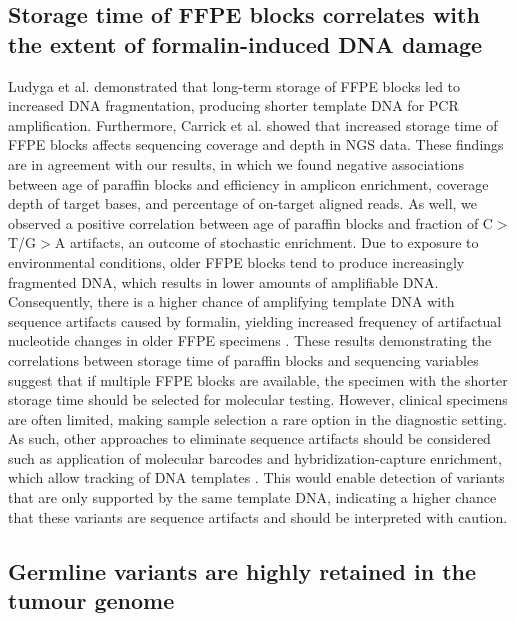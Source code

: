\subsection{Storage time of FFPE blocks correlates with the extent of formalin-induced DNA damage}

Ludyga et al. \cite{Ludyga2012} demonstrated that long-term storage of FFPE blocks led to increased DNA fragmentation, producing shorter template DNA for PCR amplification. Furthermore, Carrick et al. \cite{Carrick2015} showed that increased storage time of FFPE blocks affects sequencing coverage and depth in NGS data. These findings are in agreement with our results, in which we found negative associations between age of paraffin blocks and efficiency in amplicon enrichment, coverage depth of target bases, and percentage of on-target aligned reads. As well, we observed a positive correlation between age of paraffin blocks and fraction of C$>$T/G$>$A artifacts, an outcome of stochastic enrichment. Due to exposure to environmental conditions, older FFPE blocks tend to produce increasingly fragmented DNA, which results in lower amounts of amplifiable DNA. Consequently, there is a higher chance of amplifying template DNA with sequence artifacts caused by formalin, yielding increased frequency of artifactual nucleotide changes in older FFPE specimens \cite{Wong2014}. These results demonstrating the correlations between storage time of paraffin blocks and sequencing variables suggest that if multiple FFPE blocks are available, the specimen with the shorter storage time should be selected for molecular testing. However, clinical specimens are often limited, making sample selection a rare option in the diagnostic setting. As such, other approaches to eliminate sequence artifacts should be considered such as application of molecular barcodes and hybridization-capture enrichment, which allow tracking of DNA templates \cite{Eijkelenboom2016, Samorodnitsky2015, Peng2015, Wong2013}. This would enable detection of variants that are only supported by the same template DNA, indicating a higher chance that these variants are sequence artifacts and should be interpreted with caution.

\subsection{Germline variants are highly retained in the tumour genome}

